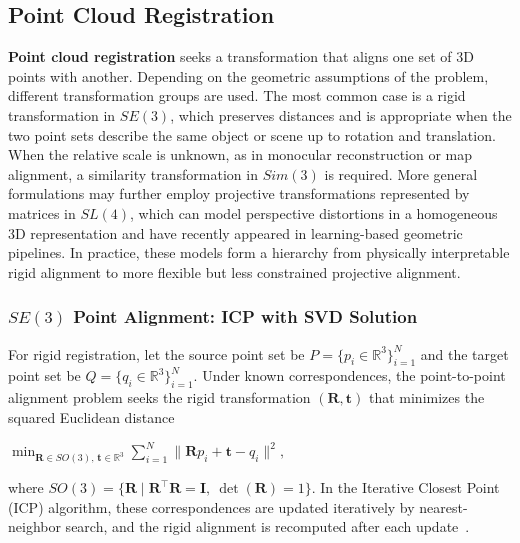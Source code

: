 \subsection{Point Cloud Registration}
\textbf{Point cloud registration} seeks a transformation that aligns one set of 3D points with another. Depending on the geometric assumptions of the problem, different transformation groups are used. The most common case is a rigid transformation in $SE(3)$, which preserves distances and is appropriate when the two point sets describe the same object or scene up to rotation and translation. When the relative scale is unknown, as in monocular reconstruction or map alignment, a similarity transformation in $Sim(3)$ is required. More general formulations may further employ projective transformations represented by matrices in $SL(4)$, which can model perspective distortions in a homogeneous 3D representation and have recently appeared in learning-based geometric pipelines. In practice, these models form a hierarchy from physically interpretable rigid alignment to more flexible but less constrained projective alignment.

\subsubsection*{\boldmath$SE(3)$ Point Alignment: ICP with SVD Solution}
For rigid registration, let the source point set be $P=\{p_i\in\mathbb{R}^3\}_{i=1}^{N}$ and the target point set be $Q=\{q_i\in\mathbb{R}^3\}_{i=1}^{N}$. Under known correspondences, the point-to-point alignment problem seeks the rigid transformation $(\mathbf{R},\mathbf{t})$ that minimizes the squared Euclidean distance
\begin{center}
    $\displaystyle \min_{\mathbf{R}\in SO(3),\,\mathbf{t}\in\mathbb{R}^3} \sum_{i=1}^{N}\|\mathbf{R}p_i+\mathbf{t}-q_i\|^2,$
\end{center}
where $SO(3)=\{\mathbf{R}\mid \mathbf{R}^\top \mathbf{R}=\mathbf{I},\ \det(\mathbf{R})=1\}$. In the Iterative Closest Point (ICP) algorithm, these correspondences are updated iteratively by nearest-neighbor search, and the rigid alignment is recomputed after each update~\cite{besl1992icp,hartley2004multiple}.

